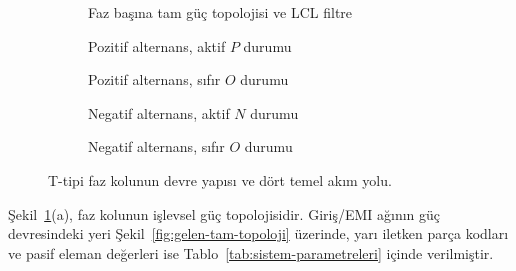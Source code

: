 \begin{figure}[H]
  \centering
  \begin{subfigure}[t]{0.96\textwidth}
    \centering
    \resizebox{0.98\linewidth}{!}{\ttypefulltopology}
    \caption{Faz başına tam güç topolojisi ve LCL filtre}
  \end{subfigure}

  \vspace{4mm}
  \begin{subfigure}[t]{0.48\textwidth}
    \centering
    \caption{Pozitif alternans, aktif $P$ durumu}
  \end{subfigure}\hfill
  \begin{subfigure}[t]{0.48\textwidth}
    \centering
    \caption{Pozitif alternans, sıfır $O$ durumu}
  \end{subfigure}

  \vspace{4mm}
  \begin{subfigure}[t]{0.48\textwidth}
    \centering
    \caption{Negatif alternans, aktif $N$ durumu}
  \end{subfigure}\hfill
  \begin{subfigure}[t]{0.48\textwidth}
    \centering
    \caption{Negatif alternans, sıfır $O$ durumu}
  \end{subfigure}

  \vspace{3mm}
  \caption{T-tipi faz kolunun devre yapısı ve dört temel akım yolu.}
  \label{fig:t-tipi-akim-yollari}
\end{figure}

\begin{samepage}
  Şekil~\ref{fig:t-tipi-akim-yollari}(a), faz kolunun işlevsel güç topolojisidir. Giriş/EMI ağının güç devresindeki yeri Şekil~\ref{fig:gelen-tam-topoloji} üzerinde, yarı iletken parça kodları ve pasif eleman değerleri ise Tablo~\ref{tab:sistem-parametreleri} içinde verilmiştir.
\end{samepage}

